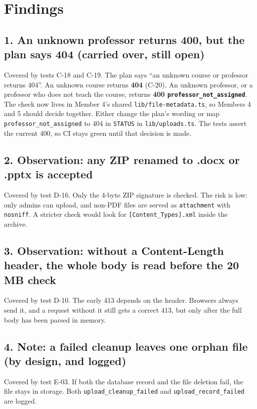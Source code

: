 \documentclass[10pt,a4paper]{article}
\begin{document}
\section*{Findings}
\subsection*{1. An unknown professor returns 400, but the plan says 404 (carried over, still open)}
Covered by tests C-18 and C-19. The plan says \textquotedblleft an unknown course or professor returns 404\textquotedblright. An unknown course returns \textbf{404} (C-20). An unknown professor, or a professor who does not teach the course, returns \textbf{400 \texttt{professor\_not\_assigned}}. The check now lives in Member 4's shared \texttt{lib/file-metadata.ts}, so Members 4 and 5 should decide together. Either change the plan's wording or map \texttt{professor\_not\_assigned} to 404 in \texttt{STATUS} in \texttt{lib/uploads.ts}. The tests assert the current 400, so CI stays green until that decision is made.

\subsection*{2. Observation: any ZIP renamed to .docx or .pptx is accepted}
Covered by test D-16. Only the 4-byte ZIP signature is checked. The risk is low: only admins can upload, and non-PDF files are served as \texttt{attachment} with \texttt{nosniff}. A stricter check would look for \texttt{[Content\_Types].xml} inside the archive.

\subsection*{3. Observation: without a Content-Length header, the whole body is read before the 20 MB check}
Covered by test D-10. The early 413 depends on the header. Browsers always send it, and a request without it still gets a correct 413, but only after the full body has been parsed in memory.

\subsection*{4. Note: a failed cleanup leaves one orphan file (by design, and logged)}
Covered by test E-03. If both the database record and the file deletion fail, the file stays in storage. Both \texttt{upload\_cleanup\_failed} and \texttt{upload\_record\_failed} are logged.
\end{document}
